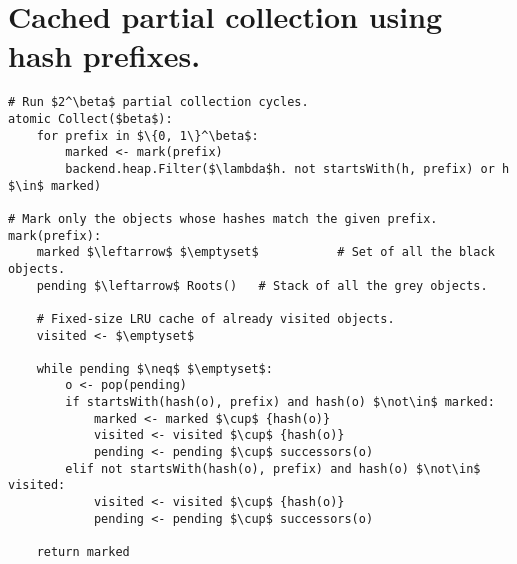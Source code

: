 \section{Cached partial collection using hash prefixes.}
\label{app:partial-prefix-lru}

\centering
\begin{lstlisting}
# Run $2^\beta$ partial collection cycles.
atomic Collect($beta$):
    for prefix in $\{0, 1\}^\beta$:
        marked <- mark(prefix)
        backend.heap.Filter($\lambda$h. not startsWith(h, prefix) or h $\in$ marked)

# Mark only the objects whose hashes match the given prefix.
mark(prefix):
    marked $\leftarrow$ $\emptyset$           # Set of all the black objects.
    pending $\leftarrow$ Roots()   # Stack of all the grey objects.

    # Fixed-size LRU cache of already visited objects.
    visited <- $\emptyset$

    while pending $\neq$ $\emptyset$:
        o <- pop(pending)
        if startsWith(hash(o), prefix) and hash(o) $\not\in$ marked:
            marked <- marked $\cup$ {hash(o)}
            visited <- visited $\cup$ {hash(o)}
            pending <- pending $\cup$ successors(o)
        elif not startsWith(hash(o), prefix) and hash(o) $\not\in$ visited:
            visited <- visited $\cup$ {hash(o)}
            pending <- pending $\cup$ successors(o)

    return marked
\end{lstlisting}
